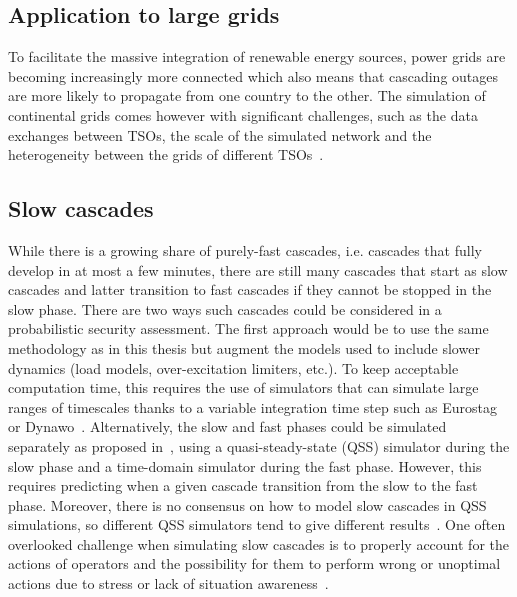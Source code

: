 
\subsection*{Application to large grids}

To facilitate the massive integration of renewable energy sources, power grids are becoming increasingly more connected which also means that cascading outages are more likely to propagate from one country to the other. The simulation of continental grids comes however with significant challenges, such as the data exchanges between TSOs, the scale of the simulated network and the heterogeneity between the grids of different TSOs~\cite{PEGASE_project}.


\subsection*{Slow cascades}

While there is a growing share of purely-fast cascades, i.e. cascades that fully develop in at most a few minutes, there are still many cascades that start as slow cascades and latter transition to fast cascades if they cannot be stopped in the slow phase. There are two ways such cascades could be considered in a probabilistic security assessment. The first approach would be to use the same methodology as in this thesis but augment the models used to include slower dynamics (load models, over-excitation limiters, etc.). To keep acceptable computation time, this requires the use of simulators that can simulate large ranges of timescales thanks to a variable integration time step such as Eurostag~\cite{STAG} or Dynawo~\cite{Dynawo}. Alternatively, the slow and fast phases could be simulated separately as proposed in~\cite{TwoLevelPSA}, using a quasi-steady-state (QSS) simulator during the slow phase and a time-domain simulator during the fast phase. However, this requires predicting when a given cascade transition from the slow to the fast phase. Moreover, there is no consensus on how to model slow cascades in QSS simulations, so different QSS simulators tend to give different results~\cite{Benchmarking2018}. One often overlooked challenge when simulating slow cascades is to properly account for the actions of operators and the possibility for them to perform wrong or unoptimal actions due to stress or lack of situation awareness~\cite{Shahab_HRA, Panteli_Awareness}.

